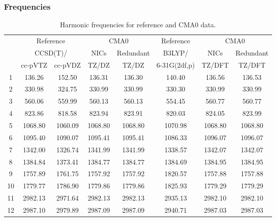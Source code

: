 \documentclass[10pt,oneside]{article}
\begin{document}
\begin{table}[h!]
\subsubsection*{Frequencies}
\centering
\caption{Harmonic frequencies for reference and CMA0 data.}
\begin{tabular}{cccccccc}
\toprule
{} & \multicolumn{2}{c}{Reference} & \multicolumn{2}{c}{CMA0} &    Reference & \multicolumn{2}{c}{CMA0} \\
{} & \multicolumn{2}{c}{CCSD(T)/} &    NICs &  Redundant &       B3LYP/ &    NICs & Redundant \\
{} &   cc-pVTZ & cc-pVDZ &   TZ/DZ &      TZ/DZ & 6-31G(2df,p) &  TZ/DFT &    TZ/DFT \\
\midrule
1  &    136.26 &  152.50 &  136.31 &     136.30 &       140.40 &  136.56 &    136.53 \\
2  &    330.98 &  324.75 &  330.99 &     330.99 &       330.30 &  330.99 &    330.99 \\
3  &    560.06 &  559.99 &  560.13 &     560.13 &       554.45 &  560.77 &    560.77 \\
4  &    823.86 &  818.58 &  823.94 &     823.91 &       820.03 &  824.05 &    823.99 \\
5  &   1068.80 & 1060.09 & 1068.80 &    1068.80 &      1070.98 & 1068.80 &   1068.80 \\
6  &   1095.40 & 1090.07 & 1095.41 &    1095.41 &      1086.33 & 1096.07 &   1096.07 \\
7  &   1342.00 & 1326.74 & 1341.99 &    1341.99 &      1338.57 & 1342.07 &   1342.07 \\
8  &   1384.84 & 1373.41 & 1384.77 &    1384.77 &      1384.69 & 1384.95 &   1384.95 \\
9  &   1757.89 & 1761.75 & 1757.92 &    1757.92 &      1820.57 & 1757.88 &   1757.88 \\
10 &   1779.77 & 1786.90 & 1779.86 &    1779.86 &      1825.93 & 1779.29 &   1779.29 \\
11 &   2982.13 & 2971.64 & 2982.13 &    2982.13 &      2935.13 & 2982.10 &   2982.10 \\
12 &   2987.10 & 2979.89 & 2987.09 &    2987.09 &      2940.71 & 2987.03 &   2987.03 \\
\bottomrule
\end{tabular}
\end{table}
\end{document}
